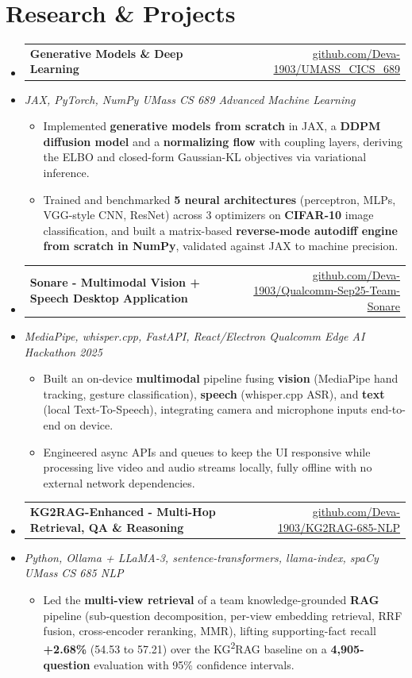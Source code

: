 \documentclass[letterpaper,10pt]{article}
\makeatletter
\newcommand{\resumeItem}[1]{
  \item\small{#1\vspace{-1pt}}
}
\newcommand{\resumeProjectHeading}[2]{
    \item
    \begin{tabular*}{0.985\textwidth}[t]{l@{\extracolsep{\fill}}r}
      \small\textbf{#1} & \small #2 \\
    \end{tabular*}\vspace{-5pt}
}
\newcommand{\resumeProjectSubheading}[1]{
  \vspace{-2pt}\item[] {\small\textcolor{ResumeSlate}{\emph{#1}}}\vspace{-3pt}
}
\newcommand{\resumeSubHeadingListStart}{\begin{itemize}[leftmargin=0.0in, label={}, itemsep=2pt, topsep=2pt]}
\newcommand{\resumeSubHeadingListEnd}{\end{itemize}}
\newcommand{\resumeItemListStart}{\begin{itemize}[leftmargin=0.18in, itemsep=2pt, topsep=1pt]}
\newcommand{\resumeItemListEnd}{\end{itemize}\vspace{-4pt}}
\makeatother
\begin{document}
\section{Research \& Projects}
\resumeSubHeadingListStart
  \resumeProjectHeading
    {Generative Models \& Deep Learning}
    {\href{https://github.com/Deva-1903/UMASS_CICS_689}{github.com/Deva-1903/UMASS\_CICS\_689}}
  \resumeProjectSubheading{JAX, PyTorch, NumPy \enspace\textbar\enspace UMass CS 689 Advanced Machine Learning}
    \resumeItemListStart
      \resumeItem{Implemented \textbf{generative models from scratch} in JAX, a \textbf{DDPM diffusion model} and a \textbf{normalizing flow} with coupling layers, deriving the ELBO and closed-form Gaussian-KL objectives via variational inference.}
      \resumeItem{Trained and benchmarked \textbf{5 neural architectures} (perceptron, MLPs, VGG-style CNN, ResNet) across 3 optimizers on \textbf{CIFAR-10} image classification, and built a matrix-based \textbf{reverse-mode autodiff engine from scratch in NumPy}, validated against JAX to machine precision.}
    \resumeItemListEnd
  \resumeProjectHeading
    {Sonare - Multimodal Vision + Speech Desktop Application}
    {\href{https://github.com/Deva-1903/Qualcomm-Sep25-Team-Sonare}{github.com/Deva-1903/Qualcomm-Sep25-Team-Sonare}}
  \resumeProjectSubheading{MediaPipe, whisper.cpp, FastAPI, React/Electron \enspace\textbar\enspace Qualcomm Edge AI Hackathon 2025}
    \resumeItemListStart
      \resumeItem{Built an on-device \textbf{multimodal} pipeline fusing \textbf{vision} (MediaPipe hand tracking, gesture classification), \textbf{speech} (whisper.cpp ASR), and \textbf{text} (local Text-To-Speech), integrating camera and microphone inputs end-to-end on device.}
      \resumeItem{Engineered async APIs and queues to keep the UI responsive while processing live video and audio streams locally, fully offline with no external network dependencies.}
    \resumeItemListEnd
  \resumeProjectHeading
    {KG2RAG-Enhanced - Multi-Hop Retrieval, QA \& Reasoning}
    {\href{https://github.com/Deva-1903/KG2RAG-685-NLP}{github.com/Deva-1903/KG2RAG-685-NLP}}
  \resumeProjectSubheading{Python, Ollama + LLaMA-3, sentence-transformers, llama-index, spaCy \enspace\textbar\enspace UMass CS 685 NLP}
    \resumeItemListStart
      \resumeItem{Led the \textbf{multi-view retrieval} of a team knowledge-grounded \textbf{RAG} pipeline (sub-question decomposition, per-view embedding retrieval, RRF fusion, cross-encoder reranking, MMR), lifting supporting-fact recall \textbf{+2.68\%} (54.53 to 57.21) over the KG\textsuperscript{2}RAG baseline on a \textbf{4{,}905-question} evaluation with 95\% confidence intervals.}
    \resumeItemListEnd
\resumeSubHeadingListEnd
\vspace{-4pt}
\end{document}
